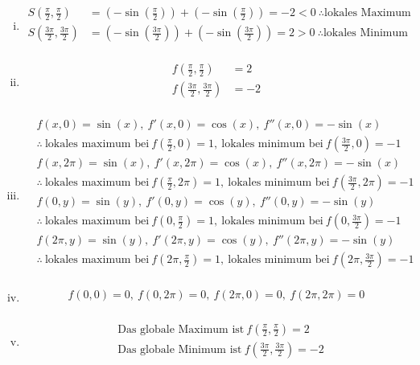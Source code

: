 \documentclass{standalone}
\begin{document}
\begin{enumerate}[i)]
\item
    \begin{align*}
        S\left(\frac{\pi}{2}, \frac{\pi}{2}\right) &= \left(-\sin\left(\frac{\pi}{2}\right)\right) + \left(-\sin\left(\frac{\pi}{2}\right)\right) = -2 < 0\ \therefore \text{lokales Maximum} \\
        S\left(\frac{3\pi}{2}, \frac{3\pi}{2}\right) &= \left(-\sin\left(\frac{3\pi}{2}\right)\right) + \left(-\sin\left(\frac{3\pi}{2}\right)\right) = 2 > 0\ \therefore \text{lokales Minimum} \\
    \end{align*}

\item
    \begin{align*}
        f\left(\frac{\pi}{2}, \frac{\pi}{2}\right) &= 2 \\
        f\left(\frac{3\pi}{2}, \frac{3\pi}{2}\right) &= -2 \\
    \end{align*}

\item
    \begin{align*}
        & f(x, 0) = \sin(x),\ f'(x, 0) = \cos(x),\ f''(x, 0) = -\sin(x) \\
        & \therefore\ \text{lokales maximum bei}\ f\left(\frac{\pi}{2}, 0\right) = 1,\ \text{lokales minimum bei}\ f\left(\frac{3\pi}{2}, 0\right) = -1 \\
        & f(x, 2\pi) = \sin(x),\ f'(x, 2\pi) = \cos(x),\ f''(x, 2\pi) = -\sin(x) \\
        & \therefore\ \text{lokales maximum bei}\ f\left(\frac{\pi}{2}, 2\pi\right) = 1,\ \text{lokales minimum bei}\ f\left(\frac{3\pi}{2}, 2\pi\right) = -1 \\
        & f(0, y) = \sin(y),\ f'(0, y) = \cos(y),\ f''(0, y) = -\sin(y) \\
        & \therefore\ \text{lokales maximum bei}\ f\left(0, \frac{\pi}{2}\right) = 1,\ \text{lokales minimum bei}\ f\left(0, \frac{3\pi}{2}\right) = -1 \\
        & f(2\pi, y) = \sin(y),\ f'(2\pi, y) = \cos(y),\ f''(2\pi, y) = -\sin(y) \\
        & \therefore\ \text{lokales maximum bei}\ f\left(2\pi, \frac{\pi}{2}\right) = 1,\ \text{lokales minimum bei}\ f\left(2\pi, \frac{3\pi}{2}\right) = -1 \\
    \end{align*}

\item
    \begin{align*}
        f(0, 0) = 0, \ f(0, 2\pi) = 0, \ f(2\pi, 0) = 0, \ f(2\pi, 2\pi) = 0 \\
    \end{align*}

\item
    \begin{align*}
        & \text{Das globale Maximum ist}\ f\left(\frac{\pi}{2}, \frac{\pi}{2}\right) = 2 \\
        & \text{Das globale Minimum ist}\ f\left(\frac{3\pi}{2}, \frac{3\pi}{2}\right) = -2 \\
    \end{align*}

\end{enumerate}
\end{document}
